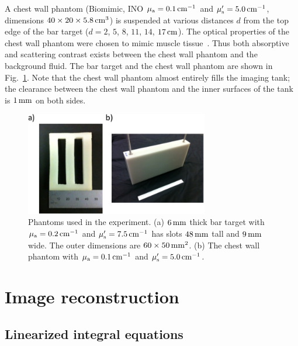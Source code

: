 A chest wall phantom (Biomimic, INO $\mu_{\rm a} = 0.1\,{\rm cm}^{-1}$ and $\mu_{\rm s}^\prime = 5.0\,{\rm cm}^{-1}$, dimensions $40\times
20\times 5.8\,{\rm cm}^3$) is suspended at various distances $d$ from the top edge of the bar target ($d=2$, $5$, $8$, $11$, $14$, $17\,{\rm
  cm}$). The optical properties of the chest wall phantom were chosen to mimic muscle tissue~\cite{ardeshirpour_10_1, kienle_99_1,taroni_03_1}.  Thus both
absorptive and scattering contrast exists between the chest wall phantom and the background fluid. The bar target and the chest wall phantom are shown in Fig.~\ref{fig:targets}.  Note that the chest wall phantom almost entirely fills the imaging tank; the clearance between the chest wall phantom and the inner surfaces of the tank is $1\,{\rm mm}$ on both sides.

\begin{figure}[t]
  \centering\includegraphics[width=8cm]{./figures/chestwall_2.pdf}
\caption{\label{fig:targets}
  Phantoms used in the experiment.  (a) $6\,{\rm mm}$ thick bar target
  with $\mu_{\rm a}=0.2\,{\rm cm}^{-1}$ and $\mu_{\rm
    s}^{\prime}=7.5\,{\rm cm}^{-1}$ has slots $48\,{\rm mm}$ tall and
  $9\,{\rm mm}$ wide. The outer dimensions are $60\times 50\,{\rm
    mm}^2$. (b) The chest wall phantom with $\mu_{\rm a}=0.1\,{\rm
    cm}^{-1}$ and $\mu_{\rm s}^{\prime}=5.0\,{\rm cm}^{-1}$.  }
\end{figure}


\section{Image reconstruction}
\label{sec:rec}

\subsection{Linearized integral equations}
\label{subsec:lin_eq}

